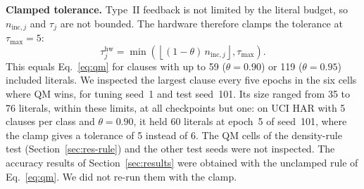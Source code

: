 \documentclass[preprint,12pt,times]{elsarticle}
\newcommand{\ninc}{n_{\mathrm{inc},j}}
\begin{document}
\textbf{Clamped tolerance.} Type~II feedback is not limited by the literal budget, so $\ninc$ and $\tau_j$ are not bounded.
The hardware therefore clamps the tolerance at $\tau_{\max} = 5$:
\begin{equation}
\tau_j^{\mathrm{hw}} = \min\left(\left\lfloor (1-\theta)\,\ninc \right\rfloor, \tau_{\max}\right).
\end{equation}
This equals Eq.~\eqref{eq:qm} for clauses with up to 59 ($\theta = 0.90$) or 119 ($\theta = 0.95$) included literals.
We inspected the largest clause every five epochs in the six cells where QM wins, for tuning seed~1 and test seed~101.
Its size ranged from 35 to 76 literals, within these limits, at all checkpoints but one: on UCI HAR with 5 clauses per class and $\theta = 0.90$, it held 60 literals at epoch~5 of seed~101, where the clamp gives a tolerance of 5 instead of 6.
The QM cells of the density-rule test (Section~\ref{sec:res-rule}) and the other test seeds were not inspected.
The accuracy results of Section~\ref{sec:results} were obtained with the unclamped rule of Eq.~\eqref{eq:qm}.
We did not re-run them with the clamp.
\end{document}
